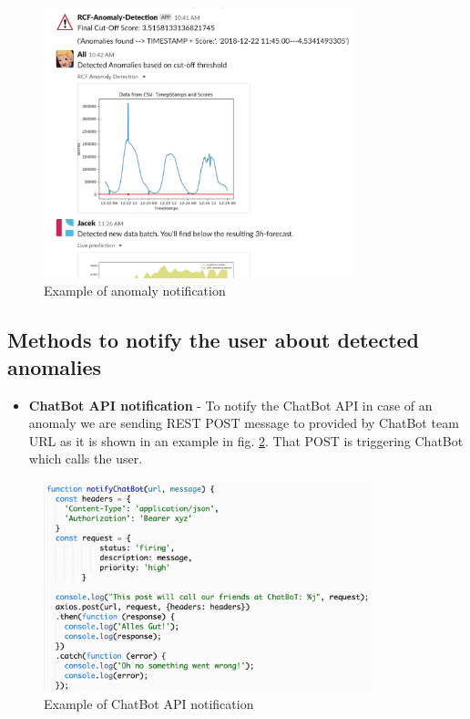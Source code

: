 \begin{figure}[h!]
    \centering
    \includegraphics[width=0.8\textwidth]{images/UserNotification.png}
    \caption{Example of anomaly notification}
    \label{fig:userNotif}
\end{figure}

\subsection{Methods to notify the user about detected anomalies}
\begin{itemize}
\item \textbf{ChatBot API notification} - To notify the ChatBot API in case of an anomaly we are sending REST POST message to provided by ChatBot team URL as it is shown in an example in fig. \ref{fig:chatbot}. That POST is triggering ChatBot which calls the user.
\end{itemize}

\begin{figure}[h!]
    \centering
    \includegraphics[width=0.85\textwidth]{images/chatbot-api-notif.png}
    \caption{Example of ChatBot API notification}
    \label{fig:chatbot}
\end{figure}


